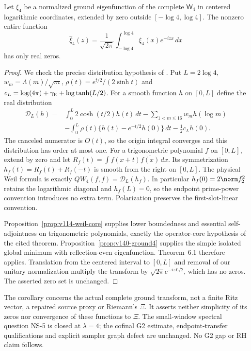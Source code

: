\begin{corollary}[Real zeros of the complete ground transform at $\lambda=4$]
\label{cor:v140-real-zeros}
Let $\xi_4$ be a normalized ground eigenfunction of the complete
$\mathsf W_4$ in centered logarithmic coordinates, extended by zero
outside $[-\log4,\log4]$. The nonzero entire function
\[
 \widehat\xi_4(z)=\frac1{\sqrt{2\pi}}
       \int_{-\log4}^{\log4}\xi_4(x)e^{-izx}\,dx
\]
has only real zeros.
\end{corollary}
\begin{proof}
We check the precise distribution hypothesis of
\cite[Theorem~6.1 and Remark~4.3]{ConnesVanSuijlekom2025}.
Put $L=2\log4$, $w_m=\Lambda(m)/\sqrt m$,
$\rho(t)=e^{t/2}/(2\sinh t)$ and
$c_L=\log(4\pi)+\gamma_{\rm E}+\log\tanh(L/2)$.
For a smooth function $h$ on $[0,L]$ define the real distribution
\begin{align*}
 \mathcal D_L(h)={}&\int_0^L2\cosh(t/2)h(t)\,dt
       -\sum_{1<m\le16}w_m h(\log m)\\
 &-\int_0^L\rho(t)\{h(t)-e^{-t/2}h(0)\}\,dt
       -\tfrac12c_Lh(0).
\end{align*}
The canceled numerator is $O(t)$, so the origin integral converges
and this distribution has order at most one. For a trigonometric
polynomial $f$ on $[0,L]$, extend by zero and let
$R_f(t)=\int f(x+t)\overline{f(x)}\,dx$. Its symmetrization
$h_f(t)=R_f(t)+R_f(-t)$ is smooth from the right on $[0,L]$.
The physical Weil formula is exactly
$QW_4(f,f)=\mathcal D_L(h_f)$. In particular
$h_f(0)=2\norm f_2^2$ retains the logarithmic diagonal and
$h_f(L)=0$, so the endpoint prime-power convention introduces no
extra term. Polarization preserves the first-slot-linear convention.

Proposition~\ref{prop:v114-weil-core} supplies lower boundedness
and essential self-adjointness on trigonometric polynomials, exactly
the operator-core hypothesis of the cited theorem.
Proposition~\ref{prop:v140-ground4} supplies the simple isolated
global minimum with reflection-even eigenfunction. Theorem~6.1
therefore applies. Translation from the centered interval to $[0,L]$
and removal of our unitary normalization multiply the transform by
$\sqrt{2\pi}e^{-izL/2}$, which has no zeros. The asserted zero set
is unchanged.
\end{proof}

The corollary concerns the actual complete ground transform, not a
finite Ritz vector, a repaired source proxy or Riemann's $\Xi$.
It asserts neither simplicity of its zeros nor convergence of these
functions to $\Xi$. The small-window spectral question NS-5 is
closed at $\lambda=4$; the cofinal G2 estimate, endpoint-transfer
qualifications and explicit sampler graph defect are unchanged.
No G2 gap or RH claim follows.
